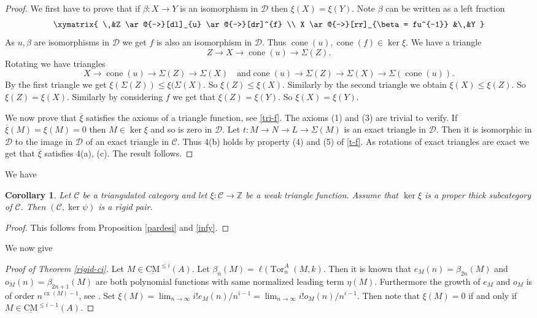 \documentclass{amsart}
\newcommand{\D}{\mathcal{D} }
\newcommand{\Z}{\mathbb{Z} }
\newcommand{\C}{\mathcal{C}}
\newcommand{\rt}{\rightarrow}
\newcommand{\ov}{\overline}
\newcommand{\cone}{\operatorname{cone}}
\newcommand{\cx}{\operatorname{cx}}
\newcommand{\CMS}{\operatorname{\underline{CM}}}
\newcommand{\Tor}{\operatorname{Tor}}
\theoremstyle{plain}
\newtheorem{corollary}[theorem]{Corollary}
\theoremstyle{definition}
\theoremstyle{remark}
\begin{document}
{\begin{proof}
   We  first have to prove that if $\beta \colon X \rt Y$  is an isomorphism in $\D$ then $\xi(X) = \xi(Y)$.
  Note  $\beta $ can be written as a left fraction
\[
\xymatrix{
\
&Z
\ar@{->}[dl]_{u}
\ar@{->}[dr]^{f}
 \\
X
\ar@{->}[rr]_{\beta = fu^{-1}}
&\
&Y
}
\]
As $u, \beta$ are isomorphisms in $\D$ we get $f$ is also an isomorphism in $\D$. Thus  $\cone(u), \cone(f) \in \ker\xi$.
We have a triangle
$$Z \rt X  \rt \cone(u) \rt\Sigma(Z).$$
Rotating we have triangles
$$  X \rt \cone(u) \rt \Sigma(Z) \rt \Sigma(X) \quad \text{and} \cone(u) \rt \Sigma(Z) \rt \Sigma(X) \rt \Sigma(\cone(u)).$$
By the first triangle we get $\xi(\Sigma(Z)) \leq \xi(\Sigma(X)$. So $\xi(Z) \leq \xi(X)$. Similarly by the second triangle we obtain $\xi(X) \leq \xi(Z)$. So $\xi(Z) = \xi(X)$.
Similarly by considering $f$ we get that $\xi(Z) = \xi(Y)$. So $\xi(X) = \xi(Y)$.

We now prove that $\ov{\xi}$ satisfies the axioms of a triangle function, see \ref{tri-f}. The axioms (1) and (3) are trivial to verify. If $\ov{\xi}(M) = \xi(M) = 0$ then $M \in \ker \xi$ and so is zero in $\D$.
Let  $t \colon M \rt N \rt L \rt \Sigma (M)$ is an exact triangle in $\D$. Then it is isomorphic in $\D$ to the image in $\D$ of an exact triangle in $\C$. Thus 4(b) holds by property (4) and (5) of \ref{t-f}.  As rotations of exact triangles are exact we get that $\ov{\xi}$ satisfies 4(a), (c). The result follows.
\end{proof}
We have
\begin{corollary}
\label{dont} Let $\C$ be a triangulated category and let $\xi \colon \C \rt \Z$ be a weak triangle function. Assume that $\ker \xi$ is a proper thick subcategory of $\C$. Then $(\C, \ker \psi)$ is a rigid pair.
\end{corollary}
\begin{proof}
  This follows from Proposition \ref{pardesi} and \ref{infy}.
\end{proof}

We now give
\begin{proof}[Proof of Theorem \ref{rigid-ci}]
Let $M \in  \CMS^{\leq i}(A)$. Let $\beta_n(M) = \ell(\Tor^A_n(M, k)$. Then it is known that $e_M(n) =  \beta_{2n}(M)$ and $o_M(n) =  \beta_{2n +1}(M)$ are both polynomial functions with same normalized leading term $\eta(M)$. Furthermore the growth of $e_M$ and $o_M$ is of order $n^{\cx(M)-1}$, see \cite[9.2.1]{A}.
Set $\xi(M) = \lim_{n \rt \infty} i!e_M(n)/n^{i-1} = \lim_{n \rt \infty} i!o_M(n)/n^{i-1}$. Then note that $\xi(M) = 0$ if and only if $M \in \CMS^{\leq i-1}(A)$.


\end{proof}}
\end{document}

